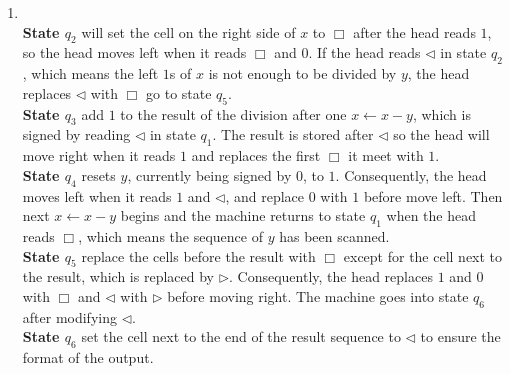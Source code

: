 \documentclass[12pt,a4paper]{article}
\makeatletter
\newtheorem*{solution}{Solution}
\theoremstyle{definition}
\renewenvironment{solution}[1][Solution] {\par\pushQED{\qed}\normalfont\topsep6\p@\@plus6\p@\relax\trivlist\item[\hskip\labelsep\bfseries#1\@addpunct{.}]\ignorespaces}{\popQED\endtrivlist\@endpefalse} \makeatother
\makeatother
\begin{document}
\begin{enumerate}
\begin{solution}
\begin{enumerate}
	\\
	\textbf{State $q_2$} will set the cell on the right side of $x$ to $\Box$ after the head reads $1$, so the head moves left when it reads $\Box$ and $0$. If the head reads $\triangleleft$ in state $q_2$, which means the left $1$s of $x$ is not enough to be divided by $y$, the head replaces $\triangleleft$ with $\Box$ go to state $q_5$.
	\\
	\textbf{State $q_3$} add $1$ to the result of the division after one $x\leftarrow x-y$, which is signed by reading $\triangleleft$ in state $q_1$. The result is stored after $\triangleleft$ so the head will move right when it reads $1$ and replaces the first $\Box$ it meet with $1$.
	\\
	\textbf{State $q_4$} resets $y$, currently being signed by $0$, to $1$. Consequently, the head moves left when it reads $1$ and $\triangleleft$, and replace $0$ with $1$ before move left. Then next $x\leftarrow x-y$ begins and the machine returns to state $q_1$ when the head reads $\Box$, which means the sequence of $y$ has been scanned. 
	\\
	\textbf{State $q_5$} replace the cells before the result with $\Box$ except for the cell next to the result, which is replaced by $\triangleright$. Consequently, the head replaces $1$ and $0$ with $\Box$ and $\triangleleft$ with $\triangleright$ before moving right. The machine goes into state $q_6$ after modifying $\triangleleft$.
	\\
	\textbf{State $q_6$} set the cell next to the end of the result sequence to $\triangleleft$ to ensure the format of the output.
	

\end{enumerate}
\end{solution}
\end{enumerate}
\end{document}
